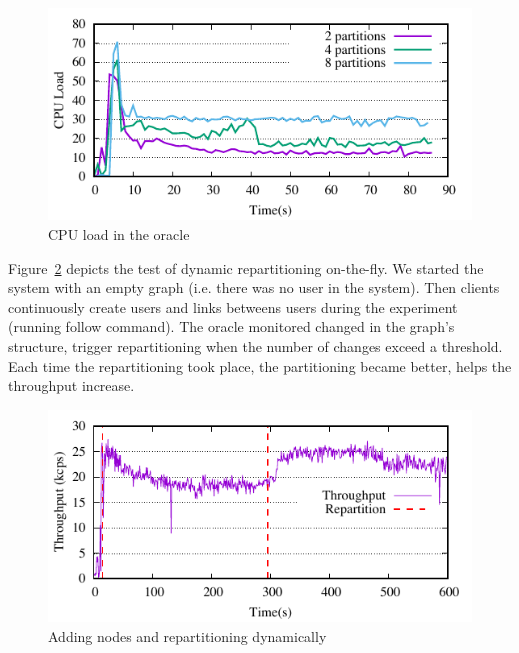 \begin{figure}[t]
	\includegraphics{figures/experiments/oracle-load}
	\caption{CPU load in the oracle}
	\label{fig:cpu_oracle}
\end{figure}


Figure~\ref{fig:dynamic_load_tput} depicts the test of dynamic repartitioning on-the-fly. 
We started the system with an empty graph (i.e. there was no user in the system). 
Then clients continuously create users and links betweens users during the experiment (running follow command). 
The oracle monitored changed in the graph's structure, trigger repartitioning when the number of changes exceed a threshold. 
Each time the repartitioning took place, the partitioning became better, helps the throughput increase. 

\begin{figure}[t]
	\includegraphics{figures/experiments/dynamicload-tp-move-4p}
	\caption{Adding nodes and repartitioning dynamically}
	\label{fig:dynamic_load_tput}
\end{figure}




